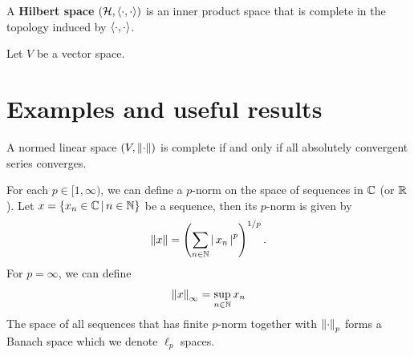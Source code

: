 \documentclass{article}
\begin{document}
\begin{fdefinition} A \textbf{Hilbert space} $(\mathcal{H}, \inprod)$ is an inner product space that is complete in the topology induced by $\inprod$. 
\end{fdefinition}

\begin{fdefinition}
\end{fdefinition}

\begin{fdefinition}
\end{fdefinition}



\begin{fdefinition} Let $V$ be a vector space. 
\end{fdefinition}


\section{Examples and useful results}


\begin{flemma} A normed linear space $(V, \norm)$ is complete if and only if all absolutely convergent series converges. 
\end{flemma}

\begin{flemma}
\end{flemma}

\begin{flemma}
\end{flemma}


\begin{ftheorem}
\end{ftheorem}





\begin{mdframed}
\begin{example} For each $p \in [1, \infty)$, we can define a $p$-norm on the space of sequences in $\C$ (or $\R$). Let $x = \set{x_n \in \C \wh n \in \N}$ be a sequence, then its $p$-norm is given by 
\begin{align*}
\norm[ x] = \brac{\sum_{n \in \N} \abs{x_n}^p}^{1/p}. 
\end{align*}
For $p = \infty$, we can define 
\begin{align*}
\norm[x]_\infty = \sup_{n \in \N} x_n
\end{align*}
The space of all sequences that has finite $p$-norm together with $\norm_p$ forms a Banach space which we denote $\ell_p$ spaces. 
\end{example}
\end{mdframed}
\end{document}
